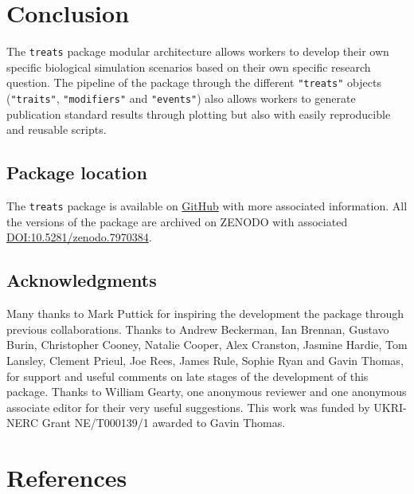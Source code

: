 \documentclass[
]{article}
\begin{document}
\hypertarget{conclusion}{%
\section{Conclusion}\label{conclusion}}

The \texttt{treats} package modular architecture allows workers to
develop their own specific biological simulation scenarios based on
their own specific research question. The pipeline of the package
through the different \texttt{"treats"} objects (\texttt{"traits"},
\texttt{"modifiers"} and \texttt{"events"}) also allows workers to
generate publication standard results through plotting but also with
easily reproducible and reusable scripts.

\hypertarget{package-location}{%
\subsection{Package location}\label{package-location}}

The \texttt{treats} package is available on
\href{https://github.com/TGuillerme/treats}{GitHub} with more associated
information. All the versions of the package are archived on ZENODO with
associated
\href{https://doi.org/10.5281/zenodo.7970384}{DOI:10.5281/zenodo.7970384}.

\hypertarget{acknowledgments}{%
\subsection{Acknowledgments}\label{acknowledgments}}

Many thanks to Mark Puttick for inspiring the development the package
through previous collaborations. Thanks to Andrew Beckerman, Ian
Brennan, Gustavo Burin, Christopher Cooney, Natalie Cooper, Alex
Cranston, Jasmine Hardie, Tom Lansley, Clement Prieul, Joe Rees, James
Rule, Sophie Ryan and Gavin Thomas, for support and useful comments on
late stages of the development of this package. Thanks to William Gearty,
one anonymous reviewer and one anonymous associate editor for their very
useful suggestions. This work was funded by UKRI-NERC Grant NE/T000139/1
awarded to Gavin Thomas.

\hypertarget{references}{%
\section*{References}\label{references}}
\end{document}
